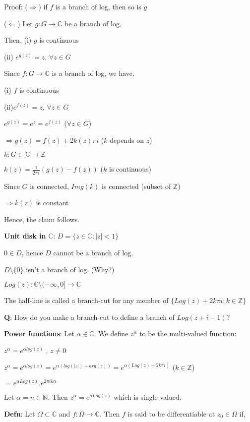 \documentclass{article}
\begin{document}
\begin{flushleft}
Proof: ($\Rightarrow$) if $f$ is a branch of log, then so is $g$

($\Leftarrow$) Let $g:G\rightarrow \mathds{C}$ be a branch of log. 

Then, (i) $g$ is continuous

(ii) $e^{g(z)}=z$, $\forall z\in G$

Since $f:G\rightarrow \mathds{C}$ is a branch of log, we have, 

(i) $f$ is continuous 

(ii)$e^{f(z)}=z$, $\forall z\in G$

$e^{g(z)}=e^z=e^{f(z)}$ ($\forall z\in G$)

$\Rightarrow g(z)=f(z)+ 2k(z)\pi i$ ($k$ depends on $z$)

$k: G\subset \mathds{C}\rightarrow \mathds{Z}$

$k(z)=\frac{1}{2\pi i}(g(z)-f(z))$ ($k$ is continuous)

Since $G$ is connected, $Img(k)$ is connected  (subset of $\mathds{Z}$)

$\Rightarrow k(z)$ is constant 

Hence, the claim follows.

\textbf{Unit disk in $\mathds{C}$}: $D=\{z\in \mathds{C}: |z|< 1\}$

$0\in D$, hence $D$ cannot be a branch of log. 

$D\setminus \{0\}$ isn't a branch of log. (Why?)

$Log(z): \mathds{C}\setminus (-\infty,0]\rightarrow \mathds{C}$

The half-line is called a branch-cut for any member of $\{Log(z)+2k\pi i: k\in \mathds{Z}\}$

\textbf{Q}: How do you make a branch-cut to define a branch of $Log(z+i-1)$?

\textbf{Power functions}: Let $\alpha \in \mathds{C}$. We define $z^{\alpha}$ to be the multi-valued function:

$z^{\alpha}=e^{\alpha log(z)}$ , $z\neq 0$

$z^{\alpha}=e^{\alpha log(z)}= e^{\alpha(log(|z|)+ arg(z))}= e^{\alpha(Log(z)+2k\pi i)}$  ($k\in \mathds{Z}$) 

$=e^{\alpha Log(z)}.e^{2\pi ik\alpha}$ 

Let $\alpha=n \in \mathds{N}$. Then $z^{\alpha}=e^{nLog(z)}$ which is single-valued.

\textbf{Defn}: Let $\Omega \subset \mathds{C}$ and $f: \Omega \rightarrow \mathds{C}$. Then $f$ is said to be differentiable at $z_0\in \Omega$ if,


\end{flushleft}
\end{document}
